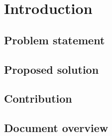 \chapter{Introduction}\label{chapter:introduction}

\section{Problem statement}
\label{sec:problem_statement}

\section{Proposed solution}
\label{sec:proposed_solution}

\section{Contribution}
\label{sec:contribution}

\section{Document overview}
\label{sec:document_overview}
